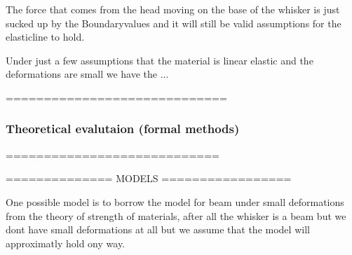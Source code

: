 The force that comes from the head moving on the base of the whisker is just 
sucked up by the Boundaryvalues and it will still be valid assumptions for the
elasticline to hold.

Under just a few assumptions that the material is linear elastic and the
deformations are small we have the ...



=============================

\subsubsection{ Theoretical evalutaion (formal methods)}

============================

============== MODELS =================

One possible model is to borrow the model for beam under small 
deformations from the theory of strength of materials,
after all the whisker is a beam but we dont have small 
deformations at all but we assume that the model will approximatly hold ony way.


